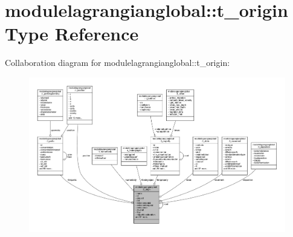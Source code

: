 \hypertarget{structmodulelagrangianglobal_1_1t__origin}{}\section{modulelagrangianglobal\+:\+:t\+\_\+origin Type Reference}
\label{structmodulelagrangianglobal_1_1t__origin}


Collaboration diagram for modulelagrangianglobal\+:\+:t\+\_\+origin\+:\nopagebreak
\begin{figure}[H]
\begin{center}
\leavevmode
\includegraphics[width=350pt]{structmodulelagrangianglobal_1_1t__origin__coll__graph}
\end{center}
\end{figure}
